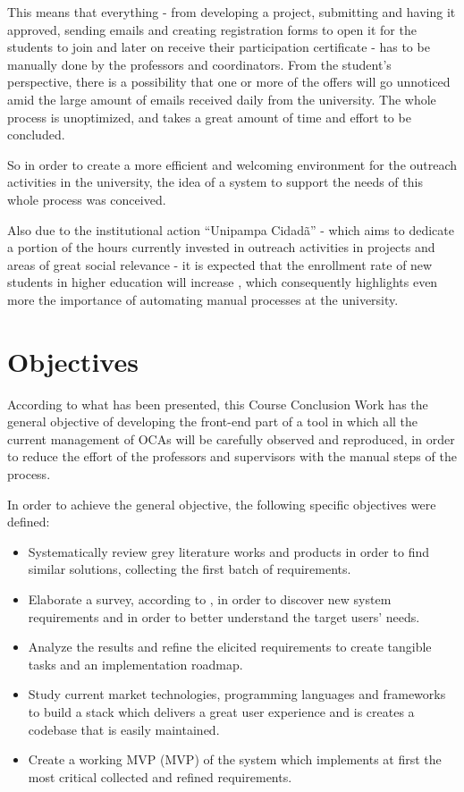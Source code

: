 This means that everything - from developing a project, submitting and having it approved, sending emails and creating registration forms to open it for the students to join and later on receive their participation certificate - has to be manually done by the professors and coordinators. From the student's perspective, there is a possibility that one or more of the offers will go unnoticed amid the large amount of emails received daily from the university. The whole process is unoptimized, and takes a great amount of time and effort to be concluded.

So in order to create a more efficient and welcoming environment for the outreach activities in the university, the idea of a system to support the needs of this whole process was conceived.

Also due to the institutional action ``Unipampa Cidadã'' - which aims to dedicate a portion of the hours currently invested in outreach activities in projects and areas of great social relevance - it is expected that the enrollment rate of new students in higher education will increase \cite{unipampacidada}, which consequently highlights even more the importance of automating manual processes at the university.

\section{Objectives}\label{sec:objectives}

According to what has been presented, this Course Conclusion Work has the general objective of developing the front-end part of a tool in which all the current management of \acp{OCA} will be carefully observed and reproduced, in order to reduce the effort of the professors and supervisors with the manual steps of the process.

In order to achieve the general objective, the following specific objectives were defined:

\begin{itemize}
    \item Systematically review grey literature works and products in order to find similar solutions, collecting the first batch of requirements.
    \item Elaborate a survey, according to \cite{kasunic2005designing}, in order to discover new system requirements and in order to better understand the target users' needs.
    \item Analyze the results and refine the elicited requirements to create tangible tasks and an implementation roadmap.
    \item Study current market technologies, programming languages and frameworks to build a stack which delivers a great user experience and is creates a codebase that is easily maintained.
    \item Create a working \acl{MVP} (\ac{MVP}) of the system which implements at first the most critical collected and refined requirements.
\end{itemize}

